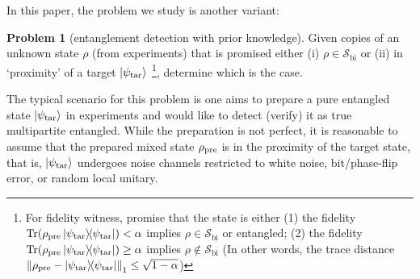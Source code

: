 \documentclass[
aps,
pra,
twocolumn,
floatfix,
]{revtex4-2}
\theoremstyle{plain}
\theoremstyle{definition}
\newtheorem{problem}{Problem}
\newcommand{\dm}{\rho}
\newcommand{\bi}{\text{bi}}
\newcommand{\target}{\textup{tar}}
\newcommand{\prepare}{\textup{pre}}
\newcommand{\separableset}{\mathcal{S}}
\newcommand{\ppartition}{\mathcal{P}}
\begin{document}
In this paper, the problem we study is another variant:
\begin{problem}[entanglement detection with prior knowledge]\label{prm:entanglement_detection}
	Given copies of an unknown state $\dm$ (from experiments) that is promised either (i) $\dm\in\separableset_{\bi}$
	or (ii) in `proximity' of a target $\ket{\psi_{\target}}$ 
	\footnote{
		For fidelity witness, promise that the state is either 
		(1) the fidelity $ \Tr(\dm_{\prepare}\op{\psi_{\target}}) < \alpha$ implies $\dm\in\separableset_{\bi}$ or entangled;
		(2) the fidelity $ \Tr(\dm_{\prepare}\op{\psi_{\target}}) \ge \alpha$ implies $\dm\notin\separableset_{\bi}$
		(In other words, the trace distance $\norm{\dm_{\prepare}-\op{\psi_\target}}_1 \le \sqrt{1-\alpha}$)
	},
	determine which is the case.
\end{problem}
The typical scenario for this problem is one aims to prepare a pure entangled state $\ket{\psi_\target}$ in experiments and would like to detect (verify) it as true multipartite entangled. 
While the preparation is not perfect, 
it is reasonable to assume that the prepared mixed state $\dm_{\prepare}$ is in the proximity of the target state,
that is, $\ket{\psi_{\target}}$ undergoes noise channels restricted to white noise, bit/phase-flip error, or random local unitary.
\end{document}
